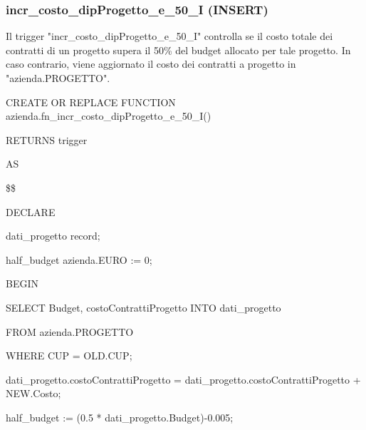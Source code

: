     \subsubsection{incr\_costo\_dipProgetto\_e\_50\_I (INSERT)}
    Il trigger "incr\_costo\_dipProgetto\_e\_50\_I" controlla se il costo totale dei contratti di un progetto supera il 50\% del budget allocato per tale progetto. In caso contrario, viene aggiornato il costo dei contratti a progetto in "azienda.PROGETTO".
    \ttfamily
        \begin{flushleft}
            \begin{description}
                \item CREATE OR REPLACE FUNCTION azienda.fn\_incr\_costo\_dipProgetto\_e\_50\_I()  
                \item RETURNS trigger
                \item AS
                \item \$\$
                \item DECLARE
                \begin{description}
                    \item dati\_progetto record;
                    \item half\_budget azienda.EURO := 0;
                \end{description}
                \item BEGIN 
                \begin{description}
                    \item SELECT Budget, costoContrattiProgetto INTO dati\_progetto
                    \item FROM azienda.PROGETTO
                    \item WHERE CUP = OLD.CUP;
                
                    \vspace{0.5cm}

                    \item dati\_progetto.costoContrattiProgetto = dati\_progetto.costoContrattiProgetto + NEW.Costo;

	                \item half\_budget := (0.5 * dati\_progetto.Budget)-0.005;
	                
                    \vspace{0.5cm}


\end{description}
\end{description}
\end{flushleft}
